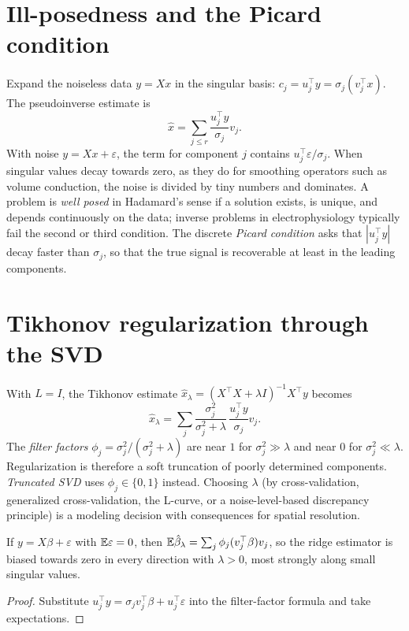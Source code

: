 \section{Ill-posedness and the Picard condition}
Expand the noiseless data $y=Xx$ in the singular basis: $c_j=u_j^\top y=\sigma_j(v_j^\top x)$. The pseudoinverse estimate is
\[
\hat x=\sum_{j\le r}\frac{u_j^\top y}{\sigma_j}v_j.
\]
With noise $y=Xx+\varepsilon$, the term for component $j$ contains $u_j^\top\varepsilon/\sigma_j$. When singular values decay towards zero, as they do for smoothing operators such as volume conduction, the noise is divided by tiny numbers and dominates. A problem is \emph{well posed} in Hadamard's sense if a solution exists, is unique, and depends continuously on the data; inverse problems in electrophysiology typically fail the second or third condition. The discrete \emph{Picard condition} asks that $|u_j^\top y|$ decay faster than $\sigma_j$, so that the true signal is recoverable at least in the leading components.

\section{Tikhonov regularization through the SVD}
With $L=I$, the Tikhonov estimate $\hat x_\lambda=(X^\top X+\lambda I)^{-1}X^\top y$ becomes
\[
\hat x_\lambda=\sum_j\frac{\sigma_j^2}{\sigma_j^2+\lambda}\,\frac{u_j^\top y}{\sigma_j}v_j.
\]
The \emph{filter factors} $\phi_j=\sigma_j^2/(\sigma_j^2+\lambda)$ are near $1$ for $\sigma_j^2\gg\lambda$ and near $0$ for $\sigma_j^2\ll\lambda$. Regularization is therefore a soft truncation of poorly determined components. \emph{Truncated SVD} uses $\phi_j\in\{0,1\}$ instead. Choosing $\lambda$ (by cross-validation, generalized cross-validation, the L-curve, or a noise-level-based discrepancy principle) is a modeling decision with consequences for spatial resolution.

\begin{proposition}
If $y=X\beta+\varepsilon$ with $\mathbb E\varepsilon=0$, then $\mathbb E\hat\beta_\lambda=\sum_j\phi_j(v_j^\top\beta)v_j$, so the ridge estimator is biased towards zero in every direction with $\lambda>0$, most strongly along small singular values.
\end{proposition}
\begin{proof}
Substitute $u_j^\top y=\sigma_jv_j^\top\beta+u_j^\top\varepsilon$ into the filter-factor formula and take expectations.
\end{proof}


